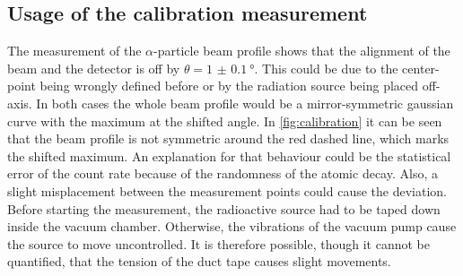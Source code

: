 \subsection{Usage of the calibration measurement}
The measurement of the $\alpha$-particle beam profile shows that the alignment of the beam and the detector is off by $\theta = \qty{1(0.1)}{\degree}$.
This could be due to the center-point being wrongly defined before or by the radiation source being placed off-axis.
In both cases the whole beam profile would be a mirror-symmetric gaussian curve with the maximum at the shifted angle.
\newline\noindent
In \autoref{fig:calibration} it can be seen that the beam profile is not symmetric around the red dashed line, which marks the shifted maximum.
An explanation for that behaviour could be the statistical error of the count rate because of the randomness of the atomic decay.
Also, a slight misplacement between the measurement points could cause the deviation.
Before starting the measurement, the radioactive source had to be taped down inside the vacuum chamber.
Otherwise, the vibrations of the vacuum pump cause the source to move uncontrolled.
It is therefore possible, though it cannot be quantified, that the tension of the duct tape causes slight movements. 
%

